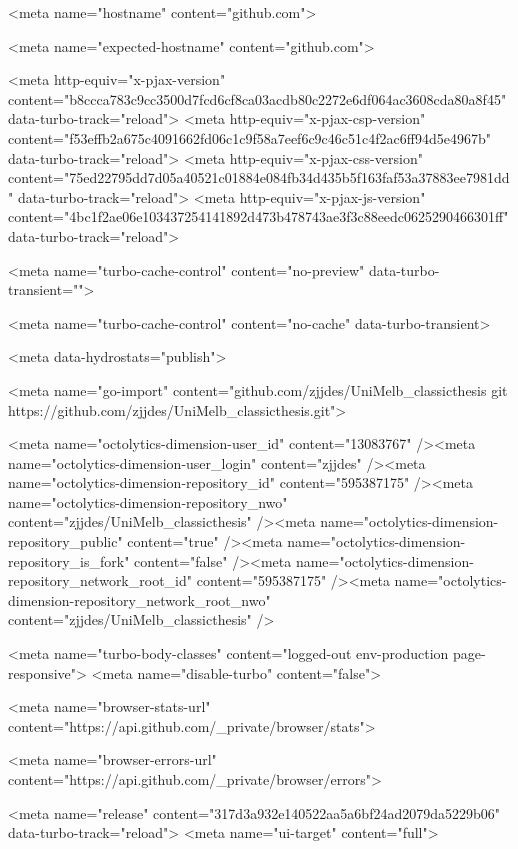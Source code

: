       <meta name="hostname" content="github.com">



        <meta name="expected-hostname" content="github.com">


  <meta http-equiv="x-pjax-version" content="b8ccca783c9cc3500d7fcd6cf8ca03acdb80c2272e6df064ac3608cda80a8f45" data-turbo-track="reload">
  <meta http-equiv="x-pjax-csp-version" content="f53effb2a675c4091662fd06c1c9f58a7eef6c9c46c51c4f2ac6ff94d5e4967b" data-turbo-track="reload">
  <meta http-equiv="x-pjax-css-version" content="75ed22795dd7d05a40521c01884e084fb34d435b5f163faf53a37883ee7981dd" data-turbo-track="reload">
  <meta http-equiv="x-pjax-js-version" content="4bc1f2ae06e103437254141892d473b478743ae3f3c88eedc0625290466301ff" data-turbo-track="reload">

  <meta name="turbo-cache-control" content="no-preview" data-turbo-transient="">

      <meta name="turbo-cache-control" content="no-cache" data-turbo-transient>

    <meta data-hydrostats="publish">

  <meta name="go-import" content="github.com/zjjdes/UniMelb_classicthesis git https://github.com/zjjdes/UniMelb_classicthesis.git">

  <meta name="octolytics-dimension-user_id" content="13083767" /><meta name="octolytics-dimension-user_login" content="zjjdes" /><meta name="octolytics-dimension-repository_id" content="595387175" /><meta name="octolytics-dimension-repository_nwo" content="zjjdes/UniMelb_classicthesis" /><meta name="octolytics-dimension-repository_public" content="true" /><meta name="octolytics-dimension-repository_is_fork" content="false" /><meta name="octolytics-dimension-repository_network_root_id" content="595387175" /><meta name="octolytics-dimension-repository_network_root_nwo" content="zjjdes/UniMelb_classicthesis" />
  



    

    <meta name="turbo-body-classes" content="logged-out env-production page-responsive">
  <meta name="disable-turbo" content="false">


  <meta name="browser-stats-url" content="https://api.github.com/_private/browser/stats">

  <meta name="browser-errors-url" content="https://api.github.com/_private/browser/errors">

    <meta name="release" content="317d3a932e140522aa5a6bf24ad2079da5229b06" data-turbo-track="reload">
  <meta name="ui-target" content="full">


